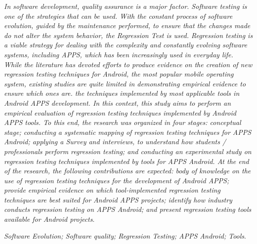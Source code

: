 


\abstract


\textit{In software development, quality assurance is a major factor. Software testing is one of the strategies that can be used. With the constant process of software evolution, guided by the maintenance performed, to ensure that the changes made do not alter the system behavior, the Regression Test is used. Regression testing is a viable strategy for dealing with the complexity and constantly evolving software systems, including APPS, which has been increasingly used in everyday life. While the literature has devoted efforts to produce evidence on the creation of new regression testing techniques for Android, the most popular mobile operating system, existing studies are quite limited in demonstrating empirical evidence to ensure which ones are. the techniques implemented by most applicable tools in Android \ac {APPS} development. In this context, this study aims to perform an empirical evaluation of regression testing techniques implemented by Android \ac {APPS} tools. To this end, the research was organized in four stages: conceptual stage; conducting a systematic mapping of regression testing techniques for \ac {APPS} Android; applying a Survey and interviews, to understand how students / professionals perform regression testing; and conducting an experimental study on regression testing techniques implemented by tools for \ac {APPS} Android. At the end of the research, the following contributions are expected: body of knowledge on the use of regression testing techniques for the development of Android \ac {APPS}; provide empirical evidence on which tool-implemented regression testing techniques are best suited for Android \ac {APPS} projects; identify how industry conducts regression testing on \ac {APPS} Android; and present regression testing tools available for Android projects}.

\begin{keywords}
\textit{Software Evolution; Software quality; Regression Testing; APPS Android; Tools}.
\end{keywords}